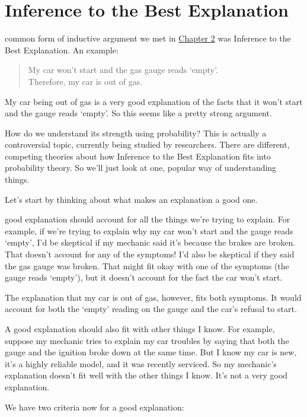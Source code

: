 \documentclass[justified]{tufte-book}
\newenvironment{argument}{\begin{quote}\normalsize}{\end{quote}}
\theoremstyle{definition}
\theoremstyle{definition}
\theoremstyle{definition}
\theoremstyle{remark}
\begin{document}
\hypertarget{bayesibe}{%
\section{Inference to the Best Explanation}\label{bayesibe}}

 common form of inductive argument we met in \protect\hyperlink{logic}{Chapter 2} was Inference to the Best Explanation. An example:

\begin{argument}
My car won't start and the gas gauge reads `empty'.\\
Therefore, my car is out of gas.
\end{argument}

My car being out of gas is a very good explanation of the facts that it won't start and the gauge reads `empty'. So this seems like a pretty strong argument.

How do we understand its strength using probability? This is actually a controversial topic, currently being studied by researchers. There are different, competing theories about how Inference to the Best Explanation fits into probability theory. So we'll just look at one, popular way of understanding things.

Let's start by thinking about what makes an explanation a good one.

 good explanation should account for all the things we're trying to explain. For example, if we're trying to explain why my car won't start and the gauge reads `empty', I'd be skeptical if my mechanic said it's because the brakes are broken. That doesn't account for any of the symptoms! I'd also be skeptical if they said the gas gauge was broken. That might fit okay with one of the symptoms (the gauge reads `empty'), but it doesn't account for the fact the car won't start.

The explanation that my car is out of gas, however, fits both symptoms. It would account for both the `empty' reading on the gauge and the car's refusal to start.

A good explanation should also fit with other things I know. For example, suppose my mechanic tries to explain my car troubles by saying that both the gauge and the ignition broke down at the same time. But I know my car is new, it's a highly reliable model, and it was recently serviced. So my mechanic's explanation doesn't fit well with the other things I know. It's not a very good explanation.

We have two criteria now for a good explanation:
\end{document}
